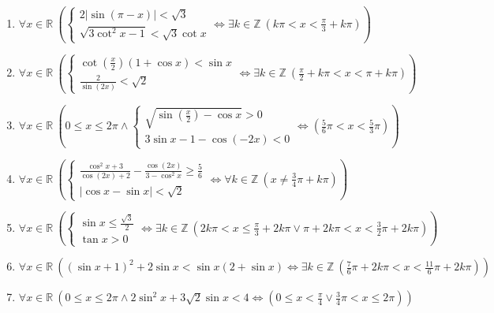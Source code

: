 \documentclass[11pt,a4paper]{article}
\begin{document}
\begin{enumerate}
\item $\displaystyle \forall x \in \mathbb{R}\ \left( \begin{cases} 2\left|\sin\left(\pi - x\right)\right| < \sqrt{3} \\ \sqrt{3\cot^{2} x - 1} < \sqrt{3}\cot x \end{cases} \iff \exists k \in \mathbb{Z}\ \left( k\pi < x < \frac{\pi}{3} + k\pi \right) \right)$
\item $\displaystyle \forall x \in \mathbb{R}\ \left( \begin{cases} \cot\left(\frac{x}{2}\right)(1 + \cos x) < \sin x \\ \frac{2}{\sin\left(2x\right)} < \sqrt{2} \end{cases} \iff \exists k \in \mathbb{Z}\ \left( \frac{\pi}{2} + k\pi < x < \pi + k\pi \right) \right)$
\item $\displaystyle \forall x \in \mathbb{R}\ \left( 0 \le x \le 2\pi \land \begin{cases} \sqrt{\sin\left(\frac{x}{2}\right) - \cos x} > 0 \\ 3\sin x - 1 - \cos\left(-2x\right) < 0 \end{cases} \iff \left( \frac{5}{6}\pi < x < \frac{5}{3}\pi \right) \right)$
\item $\displaystyle \forall x \in \mathbb{R}\ \left( \begin{cases} \frac{\cos^{2} x + 3}{\cos\left(2x\right) + 2} - \frac{\cos\left(2x\right)}{3 - \cos^{2} x} \ge \frac{5}{6} \\ \left|\cos x - \sin x\right| < \sqrt{2} \end{cases} \iff \forall k \in \mathbb{Z}\ \left( x \neq \frac{3}{4}\pi + k\pi \right) \right)$
\item $\displaystyle \forall x \in \mathbb{R}\ \left( \begin{cases} \sin x \le \frac{\sqrt{3}}{2} \\ \tan x > 0 \end{cases} \iff \exists k \in \mathbb{Z}\ \left( 2k\pi < x \le \frac{\pi}{3} + 2k\pi \lor \pi + 2k\pi < x < \frac{3}{2}\pi + 2k\pi \right) \right)$
\item $\displaystyle \forall x \in \mathbb{R}\ \left( (\sin x + 1)^{2} + 2\sin x < \sin x(2 + \sin x) \iff \exists k \in \mathbb{Z}\ \left( \frac{7}{6}\pi + 2k\pi < x < \frac{11}{6}\pi + 2k\pi \right) \right)$
\item $\displaystyle \forall x \in \mathbb{R}\ \left( 0 \le x \le 2\pi \land 2\sin^{2} x + 3\sqrt{2}\sin x < 4 \iff \left( 0 \le x < \frac{\pi}{4} \lor \frac{3}{4}\pi < x \le 2\pi \right) \right)$

\end{enumerate}
\end{document}
